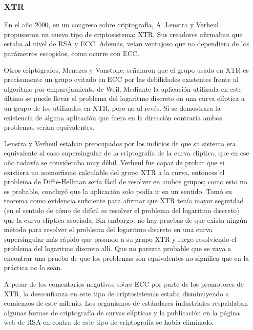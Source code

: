 \documentclass[
  a4paper,
  12pt,
  spanish,
]{scrartcl}
\begin{document}
\subsubsection{XTR}


En el año 2000, en un congreso sobre criptografía, A. Lenstra y Verheul propusieron un nuevo tipo de criptosistema: XTR. Sus creadores afirmaban que estaba al nivel de RSA y ECC. Además, veían ventajoso que no dependiera de los parámetros escogidos, como ocurre con ECC.

Otros criptógrafos, Menezes y Vanstone, señalaron que el grupo usado en XTR es precisamente un grupo evitado en ECC por las debilidades existentes frente al algoritmo por emparejamiento de Weil. Mediante la aplicación utilizada en este último se puede llevar el problema del logaritmo discreto en una curva elíptica a un grupo de los utilizados en XTR, pero no al revés. Si se demostrara la existencia de alguna aplicación que fuera en la dirección contraria ambos problemas serían equivalentes.

Lenstra y Verheul estaban preocupados por los indicios de que su sistema era equivalente al caso supersingular de la criptografía de la curva elíptica, que en ese año todavía se consideraba muy débil. Verheul fue capaz de probar que si existiera un isomorfismo calculable del grupo XTR a la curva, entonces el problema de Diffie-Hellman sería fácil de resolver en ambos grupos; como esto no es probable, concluyó que la aplicación solo podía ir en un sentido. Tomó su teorema como evidencia suficiente para afirmar que XTR tenía mayor seguridad (en el sentido de cómo de difícil es resolver el problema del logaritmo discreto) que la curva elíptica asociada. Sin embargo, no hay pruebas de que exista ningún método para resolver el problema del logaritmo discreto  en una curva supersingular más rápido que pasando a su grupo XTR y luego resolviendo el problema del logaritmo discreto allí. Que no parezca probable que se vaya a encontrar una prueba de que los problemas son equivalentes no significa que en la práctica no lo sean.

A pesar de los comentarios negativos sobre ECC por parte de los promotores de XTR, la desconfianza en este tipo de criptosistemas estaba disminuyendo a comienzos de este milenio. Los organismos de estándares industriales respaldaban algunas formas de criptografía de curvas elípticas y la publicación en la página web de RSA en contra de este tipo de criptografía se había eliminado.
\end{document}
